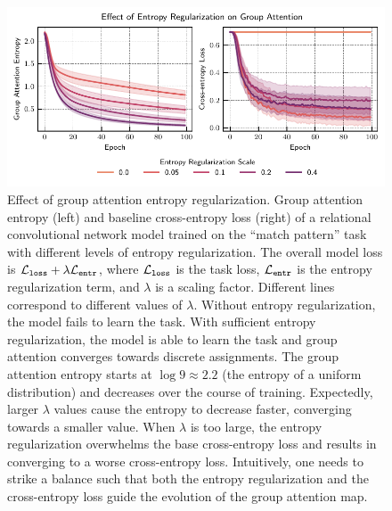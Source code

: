 \begin{figure}[H]
    \centering
    \includegraphics{figs/experiments/group_attn_entropy.pdf}
    \caption{Effect of group attention entropy regularization. Group attention entropy (left) and baseline cross-entropy loss (right) of a relational convolutional network model trained on the ``match pattern'' task with different levels of entropy regularization. The overall model loss is ${\mathcal{L}}_{\mathtt{loss}} + \lambda {\mathcal{L}}_{\mathtt{entr}}$, where ${\mathcal{L}}_{\mathtt{loss}}$ is the task loss, ${\mathcal{L}}_{\mathtt{entr}}$ is the entropy regularization term, and $\lambda$ is a scaling factor. Different lines correspond to different values of $\lambda$. Without entropy regularization, the model fails to learn the task. With sufficient entropy regularization, the model is able to learn the task and group attention converges towards discrete assignments. The group attention entropy starts at $\log 9 \approx 2.2$ (the entropy of a uniform distribution) and decreases over the course of training. Expectedly, larger $\lambda$ values cause the entropy to decrease faster, converging towards a smaller value. When $\lambda$ is too large, the entropy regularization overwhelms the base cross-entropy loss and results in converging to a worse cross-entropy loss. Intuitively, one needs to strike a balance such that both the entropy regularization and the cross-entropy loss guide the evolution of the group attention map.}\label{fig:groupattn_entropy_reg}
\end{figure}


